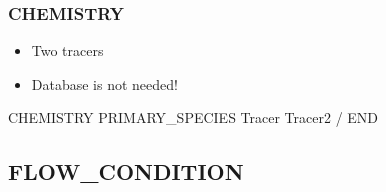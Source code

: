 \documentclass{beamer}
\begin{document}
\begin{frame}\frametitle{CHEMISTRY}

\begin{itemize}
\item Two tracers
\item Database is not needed!
\end{itemize}

\begin{semiverbatim}
CHEMISTRY
  PRIMARY_SPECIES
    Tracer
    Tracer2
  /
END
\end{semiverbatim}

\end{frame}

\subsection{FLOW\_CONDITION}
\end{document}
